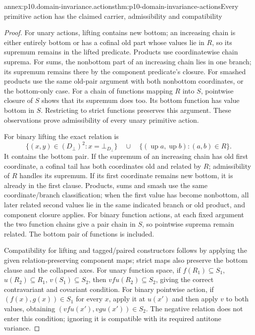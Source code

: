 \begin{annexitem}{annex:p10.domain-invariance.actions}{thm:p10-domain-invariance-actions}{Every primitive action has the claimed carrier, admissibility and compatibility}
\begin{proof}
For unary actions, lifting contains new bottom; an increasing
chain is either entirely bottom or has a cofinal old part whose
values lie in \(R\), so its supremum remains in the lifted
predicate. Products use coordinatewise chain suprema. For sums,
the nonbottom part of an increasing chain lies in one branch;
its supremum remains there by the component predicate's closure.
For smashed products use the same old-pair argument with both
nonbottom coordinates, or the bottom-only case. For a chain of
functions mapping \(R\) into \(S\), pointwise closure of \(S\)
shows that its supremum does too. Its bottom function has value
bottom in \(S\). Restricting to strict functions preserves this
argument. These observations prove admissibility of every unary
primitive action.

For binary lifting the exact relation is
\[
 \{(x,y)\in(D_{\bot})^2:x=\bot_{D_{\bot}}\}\quad\cup\quad
 \{(\operatorname{up}a,\operatorname{up}b):(a,b)\in R\}.
\]
It contains the bottom pair. If the supremum of an increasing
chain has old first coordinate, a cofinal tail has both coordinates
old and related by \(R\); admissibility of \(R\) handles its
supremum. If its first coordinate remains new bottom, it is
already in the first clause. Products, sums and smash use the
same coordinate/branch classification; when the first value has
become nonbottom, all later related second values lie in the
same indicated branch or old product, and component closure
applies. For binary function actions, at each fixed argument
the two function chains give a pair chain in \(S\), so pointwise
suprema remain related. The bottom pair of functions is included.

Compatibility for lifting and tagged/paired constructors follows
by applying the given relation-preserving component maps; strict
maps also preserve the bottom clause and the collapsed axes.
For unary function space, if \(f(R_1)\subseteq S_1\),
\(u(R_2)\subseteq R_1\), \(v(S_1)\subseteq S_2\), then
\(vfu(R_2)\subseteq S_2\), giving the correct contravariant
and covariant condition. For binary pointwise action, if
\((f(x),g(x))\in S_1\) for every \(x\), apply it at
\(u(x')\) and then apply \(v\) to both values, obtaining
\((vfu(x'),vgu(x'))\in S_2\). The negative relation does
not enter this condition; ignoring it is compatible with its
required antitone variance.


\end{proof}
\end{annexitem}
